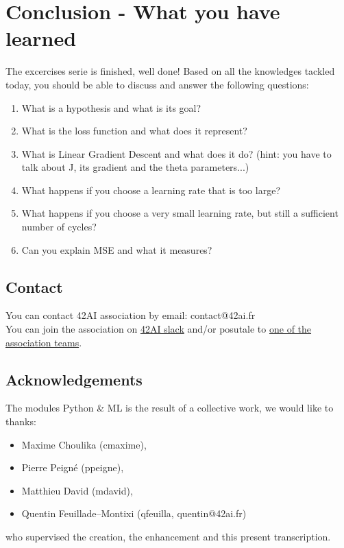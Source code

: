 \documentclass{42-en}
\begin{document}

\newpage

\chapter{Conclusion - What you have learned}

The excercises serie is finished, well done!
Based on all the knowledges tackled today, you should be able to discuss and answer the following questions:

\begin{enumerate}
  \item What is a hypothesis and what is its goal?  
  \item What is the loss function and what does it represent?   
  \item What is Linear Gradient Descent and what does it do?  
  (hint: you have to talk about J, its gradient and the theta parameters...)  
  \item What happens if you choose a learning rate that is too large?
  \item What happens if you choose a very small learning rate, but still a sufficient number of cycles?
  \item Can you explain MSE and what it measures?
\end{enumerate}



\newpage

\section*{Contact}
You can contact 42AI association by email: contact@42ai.fr\\
You can join the association on \href{https://join.slack.com/t/42-ai/shared_invite/zt-ebccw5r7-YPkDM6xOiYRPjqJXkrKgcA}{42AI slack}
and/or posutale to \href{https://forms.gle/VAFuREWaLmaqZw2D8}{one of the association teams}.

\section*{Acknowledgements}
The modules Python \& ML is the result of a collective work, we would like to thanks:
\begin{itemize}
  \item Maxime Choulika (cmaxime),
  \item Pierre Peigné (ppeigne),
  \item Matthieu David (mdavid),
  \item Quentin Feuillade--Montixi (qfeuilla, quentin@42ai.fr)
\end{itemize}
who supervised the creation, the enhancement and this present transcription.
\end{document}
